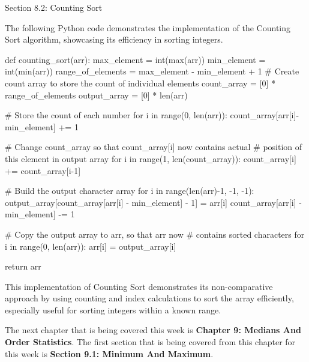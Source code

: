 \begin{notes}{Section 8.2: Counting Sort}
    \begin{highlight}
        The following Python code demonstrates the implementation of the Counting Sort algorithm, showcasing its efficiency in sorting integers.
    \begin{code}[Python]
    def counting_sort(arr):
        max_element = int(max(arr))
        min_element = int(min(arr))
        range_of_elements = max_element - min_element + 1
        # Create count array to store the count of individual elements
        count_array = [0] * range_of_elements
        output_array = [0] * len(arr)
    
        # Store the count of each number
        for i in range(0, len(arr)):
            count_array[arr[i]-min_element] += 1
    
        # Change count_array so that count_array[i] now contains actual
        # position of this element in output array
        for i in range(1, len(count_array)):
            count_array[i] += count_array[i-1]
    
        # Build the output character array
        for i in range(len(arr)-1, -1, -1):
            output_array[count_array[arr[i] - min_element] - 1] = arr[i]
            count_array[arr[i] - min_element] -= 1
    
        # Copy the output array to arr, so that arr now
        # contains sorted characters
        for i in range(0, len(arr)):
            arr[i] = output_array[i]
    
        return arr
    \end{code}
        This implementation of Counting Sort demonstrates its non-comparative approach by using counting and index calculations to sort the array efficiently, especially useful for sorting integers 
        within a known range.
    \end{highlight}      
\end{notes}

The next chapter that is being covered this week is \textbf{Chapter 9: Medians And Order Statistics}. The first section that is being covered from this chapter for this week is \textbf{Section 9.1: Minimum And Maximum}.

